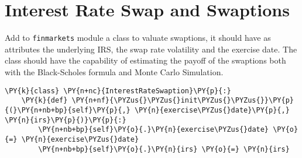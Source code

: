 \chapter{Interest Rate Swap and Swaptions}\label{introduction-to-python---lesson-9}

\begin{Exercise}[title={(Swaption Class)}]
  Add to \texttt{finmarkets} module a class to valuate swaptions, it should have as attributes the underlying IRS, the swap rate volatility and the exercise date.
  The class should have the capability of estimating the payoff of the swaptions both with the Black-Scholes formula and Monte Carlo Simulation.
\end{Exercise}

\begin{Answer}
\begin{tcolorbox}[size=fbox, boxrule=1pt, colback=cellbackground, colframe=cellborder]
\begin{Verbatim}[commandchars=\\\{\}]
\PY{k}{class} \PY{n+nc}{InterestRateSwaption}\PY{p}{:}    
    \PY{k}{def} \PY{n+nf}{\PYZus{}\PYZus{}init\PYZus{}\PYZus{}}\PY{p}{(}\PY{n+nb+bp}{self}\PY{p}{,} \PY{n}{exercise\PYZus{}date}\PY{p}{,} \PY{n}{irs}\PY{p}{)}\PY{p}{:}
        \PY{n+nb+bp}{self}\PY{o}{.}\PY{n}{exercise\PYZus{}date} \PY{o}{=} \PY{n}{exercise\PYZus{}date}
        \PY{n+nb+bp}{self}\PY{o}{.}\PY{n}{irs} \PY{o}{=} \PY{n}{irs}
        

\end{Verbatim}
\end{tcolorbox}
\end{Answer}
